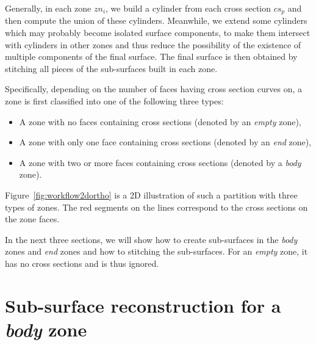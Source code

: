 Generally, in each zone $zn_i$, we build a cylinder from  each cross
section $cs_p$ and then compute the union of these cylinders.
Meanwhile, we extend some cylinders which may probably become
isolated surface components, to make them intersect with cylinders
in other zones and thus reduce the possibility of the existence of
multiple components of the final surface. The final surface is then
obtained by stitching all pieces of the sub-surfaces built in each
zone.

Specifically, depending on the number of faces  having cross section
curves on, a zone is first classified into one of the following
three types:
\begin{itemize}
    \item A zone with no faces containing cross sections (denoted by an \textit{empty} zone),
    \item A zone with only one face containing cross sections (denoted by an \textit{end} zone),
    \item A zone with two or more faces containing cross sections (denoted by a \textit{body} zone).
\end{itemize}
Figure~\ref{fig:workflow2dortho} is a 2D illustration of such a
partition with three types of zones. The red segments on the lines
correspond to the cross sections on the zone faces.


In the next three sections, we will show how to create sub-surfaces in
the \textit{body} zones and \textit{end} zones and how to stitching
the sub-surfaces. For an \textit{empty} zone, it has no cross
sections and is thus ignored.




\section{Sub-surface reconstruction for a \textit{body} zone}
\label{ch4:sec:algo:body}

